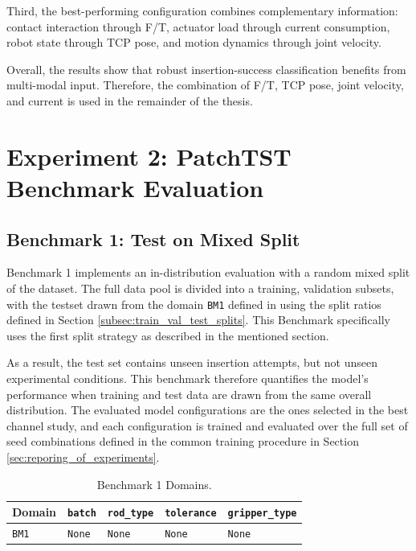 Third, the best-performing configuration combines complementary information: contact interaction through F/T, actuator load through current consumption, robot state through TCP pose, and motion dynamics through joint velocity.

Overall, the results show that robust insertion-success classification benefits from multi-modal input. Therefore, the combination of F/T, TCP pose, joint velocity, and current is used in the remainder of the thesis.






\section{Experiment 2: PatchTST Benchmark Evaluation}
\label{sec:experiment_2}
\subsection{Benchmark 1: Test on Mixed Split}
\label{sec:sq2_mixed_split}

Benchmark 1 implements an in-distribution evaluation with a random mixed split of the dataset. The full data pool is divided into a training, validation subsets, with the testset drawn from the domain \texttt{BM1} defined in  using the split ratios defined in Section \ref{subsec:train_val_test_splits}. This Benchmark specifically uses the first split strategy as described in the mentioned section.

As a result, the test set contains unseen insertion attempts, but not unseen experimental conditions. This benchmark therefore quantifies the model's performance when training and test data are drawn from the same overall distribution. The evaluated model configurations are the ones selected in the best channel study, and each configuration is trained and evaluated over the full set of seed combinations defined in the common training procedure in Section \ref{sec:reporing_of_experiments}.

\begin{table}[htbp]
    \centering
    \caption{Benchmark 1 Domains.}
    \label{tab:bm1_domains}
    \begin{tabular}{lllll}
        \toprule
        \textbf{Domain} & \textbf{\texttt{batch}} & \textbf{\texttt{rod\_type}} & \textbf{\texttt{tolerance}} & \textbf{\texttt{gripper\_type}} \\
        \midrule
        \texttt{BM1} & \texttt{None} & \texttt{None} & \texttt{None} & \texttt{None}\\
        \bottomrule
    \end{tabular}
\end{table}

